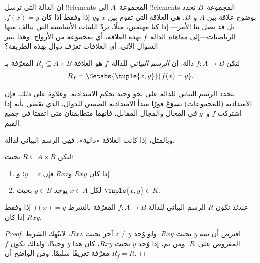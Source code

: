 \documentclass[../../../include/open-logic-section]{subfiles}
\begin{document}


\begin{explain}
إن الدالة التي ترسل !!{element}s المجموعة~$A$ إلى !!{element}s المجموعة~$B$
تحدد بوضوح علاقة بين $A$ و~$B$، هي العلاقة التي تقوم
بين $x$ و$y$ إذا وفقط إذا كان $f(x) = y$. بل قد يصل بنا الأمر---
إذا كنا مهتمين، مثلًا، بردّ اللبنات الأساسية التي تتألف منها
الرياضيات---إلى \emph{مماهاة} الدالة~$f$ بهذه
العلاقة، أي بمجموعة من الأزواج. وهذا يثير السؤال الآتي:
أي العلاقات تعرّف دوال بهذه الطريقة؟
\end{explain}

\begin{defn} لتكن $f\colon A \to B$ دالة.
إن \emph{الرسم البياني} للدالة~$f$ هو العلاقة $R_f \subseteq A \times B$
المعرّفة بـ
\[
R_f = \Setabs{\tuple{x,y}}{f(x) = y}.
\]
\end{defn}

\begin{explain}
يتحدد الرسم البياني للدالة على نحو وحيد بحكم الامتدادية.
وعلاوة على ذلك، فإن الامتدادية (للمجموعات) تسوّغ فورًا
مبدأ الامتدادية الضمني للدوال، الذي يقضي بأنه إذا اشتركت
$f$ و~$g$ في المجال والمجال المقابل، فإنهما
متطابقتان متى اتفقتا في جميع القيم.

وبالمثل، إذا كانت العلاقة «دالية»، فهي الرسم البياني لدالة.
\end{explain}

\begin{prop}
لتكن $R \subseteq A \times B$ بحيث:
\begin{enumerate}
\item إذا كان $Rxy$ و$Rxz$ فإن $y = z$؛ و
\item لكل $x \in A$ يوجد $y \in B$ بحيث $\tuple{x,
y} \in R$.
\end{enumerate}
عندئذ تكون $R$ الرسم البياني للدالة $f\colon A \to B$ المعرّفة
بالشرط $f(x) = y$ إذا وفقط إذا كان $Rxy$.
\end{prop}

\begin{proof}
افترض أن ثمة $y$ بحيث $Rxy$. ولو وُجد $z \neq
y$ آخر بحيث $Rxz$، لانتُهك الشرط المفروض على~$R$. ومن ثم، إذا
وُجد $y$ بحيث $Rxy$، كان هذا $y$ وحيدًا، ولذلك تكون $f$
معرّفة تعريفًا سليمًا. ومن الواضح أن $R_f = R$.
\end{proof}
\end{document}
